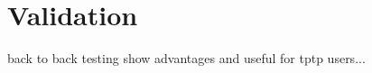 
\chapter{Validation}\label{sec:Validation}
back to back testing
show advantages and useful for tptp users...